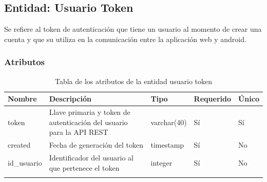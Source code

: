 \subsection{Entidad: Usuario Token}
Se refiere al token de autenticación que tiene un usuario al momento de crear una cuenta y que su utiliza en la comunicación entre la aplicación web y android.
\subsubsection{Atributos}
\begin{center}
	\begin{longtable}{|J{3cm}|J{4cm}|J{3cm}|J{2cm}|J{2cm}|}
		\hline
		\textbf{Nombre} & \textbf{Descripción} & \textbf{Tipo} & \textbf{Requerido} & \textbf{Único} \\ \hline
		token & Llave primaria y token de autenticación del usuario para la API REST & varchar(40) & Sí &  Sí\\ \hline
		created & Fecha de generación del token & timestamp & Sí & No\\ \hline
		id\_usuario & Identificador del usuario al que pertenece el token& integer & Sí & No\\ \hline
		\caption{Tabla de los atributos de la entidad usuario token}
		\label{tbl:entidad-usuario-token}
	\end{longtable}
\end{center}